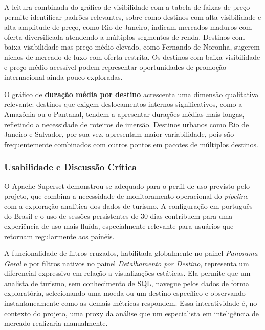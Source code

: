 A leitura combinada do gráfico de visibilidade com a tabela de faixas de preço
permite identificar padrões relevantes, sobre como destinos com alta visibilidade e alta amplitude
de preço, como Rio de Janeiro, indicam mercados maduros com oferta diversificada
atendendo a múltiplos segmentos de renda. Destinos com baixa visibilidade mas preço
médio elevado, como Fernando de Noronha, sugerem nichos de mercado de luxo com
oferta restrita. Os destinos com baixa visibilidade e preço médio acessível podem
representar oportunidades de promoção internacional ainda pouco exploradas.

O gráfico de \textbf{duração média por destino} acrescenta uma dimensão qualitativa
relevante: destinos que exigem deslocamentos internos significativos, como a Amazônia
ou o Pantanal, tendem a apresentar durações médias mais longas, refletindo a
necessidade de roteiros de imersão. Destinos urbanos como Rio de Janeiro e Salvador,
por sua vez, apresentam maior variabilidade, pois são frequentemente combinados com
outros pontos em pacotes de múltiplos destinos.

\subsubsection{Usabilidade e Discussão Crítica}

O Apache Superset demonstrou-se adequado para o perfil de uso previsto pelo projeto,
que combina a necessidade de monitoramento operacional do \textit{pipeline} com a
exploração analítica dos dados de turismo. A configuração em português do Brasil e o uso de sessões persistentes de 30
dias contribuem para uma experiência de uso mais fluída, especialmente relevante para
usuários que retornam regularmente aos painéis.

A funcionalidade de filtros cruzados, habilitada globalmente no painel
\textit{Panorama Geral} e por filtros nativos no painel \textit{Detalhamento por
Destino}, representa um diferencial expressivo em relação a visualizações estáticas. Ela permite que um analista de turismo, sem conhecimento de SQL, navegue pelos dados
de forma exploratória, selecionando uma moeda ou um destino específico e observando
instantaneamente como as demais métricas respondem. Essa interatividade é, no contexto
do projeto, uma proxy da análise que um especialista em inteligência de mercado
realizaria manualmente.

